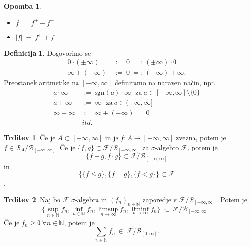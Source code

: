 \documentclass[11pt]{article}
\newcommand{\N}{\mathbb{N}}
\newcommand{\F}{\mathcal{F}}
\newcommand{\B}{\mathscr{B}}
\newcommand{\set}[1]{\{#1\}}
\newcommand{\1}{\mathbbm{1}}
\newcommand{\rr}{[-\infty,\infty]}
\theoremstyle{definition}
\newtheorem{definicija}{Definicija}[section]
\theoremstyle{definition}
\newtheorem{trditev}{Trditev}[section]
\theoremstyle{definition}
\theoremstyle{definition}
\newtheorem*{opomba}{Opomba}
\begin{document}
\begin{opomba}
~
\begin{itemize}
	\item $f ~=~ f^+ - f^-$
	\item $|f| ~=~ f^+ + f^-$
\end{itemize}

\end{opomba}
\vspace{0.5cm}

\begin{definicija}

Dogovorimo se
\begin{align*}
0 \cdot (\pm \infty) ~&:=~ 0 ~=:~ (\pm \infty) \cdot 0 \\
\infty + (-\infty) ~&:=~ 0 ~=:~ (-\infty) + \infty.
\end{align*}
Preostanek aritmetike na $\rr$ definiramo na naraven način, npr.
\begin{align*}
a \cdot \infty ~&:=~ \text{sgn}(a) \cdot \infty ~~~\text{za}~ a \in \rr \setminus \set{0} \\
a + \infty ~&:=~ \infty ~~~\text{za}~ a \in (-\infty, \infty] \\
\infty - \infty ~&:=~ \infty + (-\infty) ~=~ 0 \\
&itd.
\end{align*}

\end{definicija}
\vspace{0.5cm}

\begin{trditev}

Če je $A \subset \rr$ in je $f: A \rightarrow \rr$ zvezna, potem je $f \in \B_A/\B_{\rr}$. Če je $\set{f,g} \subset \F/\B_{\rr}$ za $\sigma$-algebro $\F$, potem je 
$$\set{f+g,f \cdot g} \subset \F/\B_{\rr}$$ 
in 
$$\set{\set{f \leq g}, \set{f=g}, \set{f<g}} \subset \F$$.

\end{trditev}
\vspace{0.5cm}

\begin{trditev}

Naj bo $\F$ $\sigma$-algebra in $(f_n)_{n \in \N}$ zaporedje v $\F/\B_{\rr}$. Potem je
$$\set{\sup_{n \in \N} f_n, \inf_{n \in \N} f_n, \limsup_{n \rightarrow \infty} f_n, \liminf_{n \rightarrow \infty} f_n} ~\subset~ \F/\B_{\rr}.$$
Če je $f_n \geq 0 ~\forall n \in \N$, potem je 
$$\sum_{n \in \N} f_n ~\in~ \F/\B_{[0,\infty]}.$$ 

\end{trditev}
\vspace{0.5cm}
\end{document}
